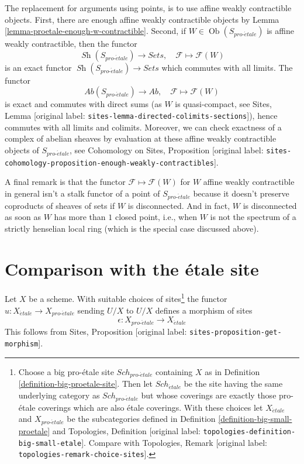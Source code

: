 \documentclass[10pt,a4paper]{article}
\theoremstyle{plain}
\theoremstyle{definition}
\theoremstyle{remark}
\numberwithin{equation}{subsection}
\def\Sch{\mathit{Sch}}
\def\Ob{\mathop{\mathrm{Ob}}\nolimits}
\def\Sh{\mathop{\mathit{Sh}}\nolimits}
\def\proetale{{pro\text{-}\acute{e}tale}}
\def\etale{{\acute{e}tale}}
\begin{document}
\medskip\noindent
The replacement for arguments using points, is to use affine
weakly contractible objects.
First, there are enough affine weakly contractible objects by
Lemma \ref{lemma-proetale-enough-w-contractible}.
Second, if $W \in \Ob(S_\proetale)$ is affine weakly contractible,
then the functor
$$
\Sh(S_\proetale) \longrightarrow \textit{Sets},\quad
\mathcal{F} \longmapsto \mathcal{F}(W)
$$
is an exact functor $\Sh(S_\proetale) \to \textit{Sets}$ which commutes
with all limits. The functor
$$
\textit{Ab}(S_\proetale) \longrightarrow \textit{Ab},\quad
\mathcal{F} \longmapsto \mathcal{F}(W)
$$
is exact and commutes with direct sums (as $W$ is quasi-compact, see
Sites, Lemma \textnormal{[original label: \nolinkurl{sites-lemma-directed-colimits-sections}]}), hence
commutes with all limits and colimits. Moreover, we can check exactness of
a complex of abelian sheaves by evaluation at these affine
weakly contractible objects of $S_\proetale$, see
Cohomology on Sites, Proposition
\textnormal{[original label: \nolinkurl{sites-cohomology-proposition-enough-weakly-contractibles}]}.

\medskip\noindent
A final remark is that the functor $\mathcal{F} \mapsto \mathcal{F}(W)$
for $W$ affine weakly contractible in general isn't a stalk functor of a
point of $S_\proetale$ because it doesn't preserve coproducts of sheaves of
sets if $W$ is disconnected. And in fact, $W$ is disconnected as soon as $W$
has more than $1$ closed point, i.e., when $W$ is not the spectrum of a
strictly henselian local ring (which is the special case discussed above).





\section{Comparison with the \'etale site}
\label{section-comparison}

\noindent
Let $X$ be a scheme. With suitable choices of sites\footnote{Choose
a big pro-\'etale site $\Sch_\proetale$ containing $X$ as in
Definition \ref{definition-big-proetale-site}. Then let $\Sch_\etale$
be the site having the same underlying category as $\Sch_\proetale$ but
whose coverings are exactly those pro-\'etale coverings which are also
\'etale coverings. With these choices let $X_\etale$ and $X_\proetale$
be the subcategories defined in
Definition \ref{definition-big-small-proetale} and
Topologies, Definition \textnormal{[original label: \nolinkurl{topologies-definition-big-small-etale}]}.
Compare with
Topologies, Remark \textnormal{[original label: \nolinkurl{topologies-remark-choice-sites}]}.}
the functor $u : X_\etale \to X_\proetale$ sending
$U/X$ to $U/X$ defines a morphism of sites
$$
\epsilon : X_\proetale \longrightarrow X_\etale
$$
This follows from Sites, Proposition \textnormal{[original label: \nolinkurl{sites-proposition-get-morphism}]}.
\end{document}
